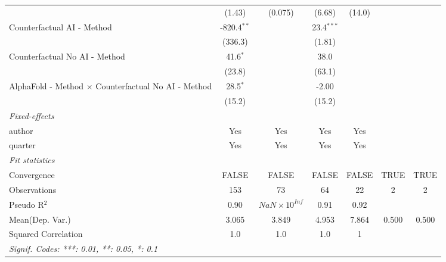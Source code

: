\begin{tabular}{lcccccc}
                                                              & (1.43)        & (0.075)               & (6.68)       & (14.0)       &      &   \\   
   Counterfactual AI - Method                                 & -820.4$^{**}$ &                       & 23.4$^{***}$ &              &      &   \\   
                                                              & (336.3)       &                       & (1.81)       &              &      &   \\   
   Counterfactual No AI - Method                              & 41.6$^{*}$    &                       & 38.0         &              &      &   \\   
                                                              & (23.8)        &                       & (63.1)       &              &      &   \\   
   AlphaFold - Method $\times$ Counterfactual No AI - Method  & 28.5$^{*}$    &                       & -2.00        &              &      &   \\   
                                                              & (15.2)        &                       & (15.2)       &              &      &   \\   
   \midrule
   \emph{Fixed-effects}\\
   author                                                     & Yes           & Yes                   & Yes          & Yes          &      & \\  
   quarter                                                    & Yes           & Yes                   & Yes          & Yes          &      & \\  
   \midrule
   \emph{Fit statistics}\\
   Convergence                                                &FALSE          & FALSE                 & FALSE        & FALSE        & TRUE & TRUE\\  
   Observations                                               & 153           & 73                    & 64           & 22           & 2    & 2\\  
   Pseudo R$^2$                                               & 0.90          & $NaN\times 10^{Inf}$  & 0.91         & 0.92         &      & \\  
Mean(Dep. Var.) & 3.065 & 3.849 & 4.953 & 7.864 & 0.500 & 0.500 \\
   Squared Correlation                                        & 1.0           & 1.0                   & 1.0          & 1            &      & \\  
   \midrule \midrule
   \multicolumn{7}{l}{\emph{Signif. Codes: ***: 0.01, **: 0.05, *: 0.1}}\\
\end{tabular}
\par\endgroup
